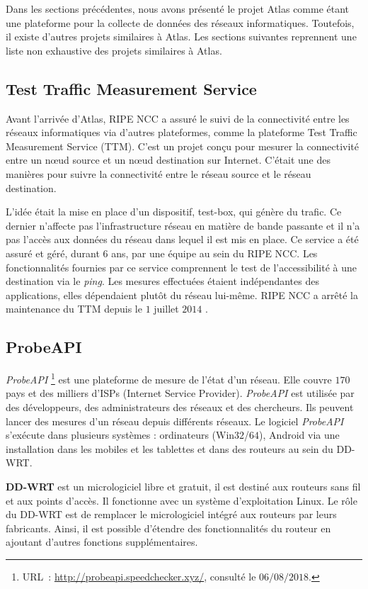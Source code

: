 Dans les sections précédentes, nous avons présenté  le projet  Atlas comme étant une plateforme pour la collecte de données des réseaux informatiques.  Toutefois, il existe d'autres projets similaires à  Atlas. Les sections suivantes reprennent une liste non exhaustive des projets similaires  à  Atlas.

\subsection{Test Traffic Measurement Service}

Avant l'arrivée d'Atlas, RIPE NCC a assuré le suivi de la connectivité entre les réseaux informatiques via  d'autres plateformes, comme la plateforme Test Traffic Measurement Service (TTM). C'est un projet conçu pour mesurer la connectivité entre un n\oe{}ud  source  et  un n\oe{}ud destination sur Internet.  C'était une des manières  pour  suivre la connectivité entre le réseau source et le réseau destination. 

L'idée était la mise en place d'un dispositif, test-box,  qui génère du trafic. Ce dernier n'affecte pas l'infrastructure réseau en matière de bande passante et il n'a pas l'accès aux données du réseau dans lequel il est mis en place.
Ce service a été assuré et géré, durant $6$ ans, par une équipe au sein du RIPE NCC. Les fonctionnalités fournies par ce service comprennent le test de l'accessibilité à une destination via le \textit{ping}. Les mesures effectuées étaient indépendantes des applications, elles dépendaient plutôt du  réseau lui-même. RIPE NCC   a  arrêté la maintenance du  TTM depuis le $1$ juillet $2014$ \cite{TTM}.


\subsection{ProbeAPI}

\textit{ProbeAPI} \footnote{URL~: \url{http://probeapi.speedchecker.xyz/}, consulté le $06/08/2018$.} est  une plateforme de mesure de l'état  d'un réseau.  Elle  couvre $170$ pays et des milliers d'ISPs (Internet Service Provider). \textit{ProbeAPI} est utilisée par des développeurs, des administrateurs des réseaux et des chercheurs. Ils peuvent lancer des mesures d'un réseau depuis différents réseaux.
Le logiciel \textit{ProbeAPI}  s'exécute dans plusieurs systèmes :  ordinateurs (Win$32$/$64$), Android via une installation dans les mobiles et les tablettes et   dans des routeurs au sein du DD-WRT.
\begin{tcolorbox}
	\textbf{DD-WRT} est un micrologiciel libre et gratuit, il est destiné aux routeurs sans fil et aux points d'accès. Il fonctionne  avec un système d'exploitation Linux. Le rôle du DD-WRT est de remplacer le micrologiciel intégré aux routeurs par leurs fabricants. Ainsi, il est possible  d'étendre des fonctionnalités du routeur en ajoutant d'autres fonctions supplémentaires.
\end{tcolorbox}


